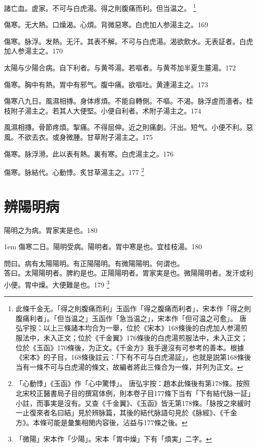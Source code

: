 諸亡血。虗家。不可与白虎湯。得之則腹痛而利。但当温之。
	\footnote{
		此條千金无。「得之則腹痛而利」玉函作「得之腹痛而利者」，宋本作「得之則腹痛利者」。「但当温之」玉函作「急当温之」，宋本作「但可温之可愈」。
		唐弘宇按：以上三條諸本均合为一舉，位於《宋本》168條後的白虎加人参湯煎服法中，未入正文；位於《千金翼》176條後的白虎湯煎服法中，未入正文；位於《玉函》170條後，为正文。《千金方》我手邊沒有可参考的善本。根據《宋本》的子目，168條後註云：「下有不可与白虎湯証」，也就是説第168條後当有一條不可与白虎湯的條文，故編者將此三條合为一條，并列为正文。
	}

傷寒。无大熱。口燥渴。心煩。背微惡寒。白虎{\khaaitp 加人参}湯主之。169

傷寒。脉浮。发熱。无汗。其表不解。不可与白虎湯。渴欲飲水。无表証者。白虎{\khaaitp 加人参}湯主之。170

太陽与少陽合病。自下利者。与黄芩湯。若嘔者。与黄芩加半夏生薑湯。172

傷寒。胸中有熱。胃中有邪气。腹中痛。欲嘔吐。黄連湯主之。173

傷寒八九日。風濕相摶。身体疼煩。不能自轉側。不嘔。不渴。脉浮虗而濇者。桂枝附子湯主之。若其人大便堅。小便自利者。术附子湯主之。174

風濕相摶。骨節疼煩。掣痛。不得屈伸。近之則痛劇。汗出。短气。小便不利。惡風。不欲去衣。或身微腫。甘草附子湯主之。175

傷寒。脉浮滑。此以表有熱。裏有寒。白虎湯主之。176

傷寒。脉結代。心動悸。炙甘草湯主之。177
	\footnote{
		「心動悸」《玉函》作「心中驚悸」。
		唐弘宇按：趙本此條後有第178條。按照北宋校正醫書局子目的撰寫体例，則本卷子目177條下当有「下有結代脉一証」小註，而事実是沒有。又查《千金翼》、《玉函》皆无第178條。「脉按之來緩时一止復來者名曰結」見於辨脉篇，其後的結代脉語句見於《脉經》、《千金方》。本條可能是彙集相関内容後，沾益与177條之後。
		}

\chapter{辨陽明病}

陽明之为病。胃家実是也。180

\hangindent 1em
傷寒二日。陽明受病。陽明者。胃中寒是也。宜桂枝湯。{\gaoben}180

問曰。病有太陽陽明。有正陽陽明。有微陽陽明。何谓也。\\
答曰。太陽陽明者。脾約是也。正陽陽明者。胃家実是也。微陽陽明者。发汗或利小便。胃中燥。大便難是也。179
	\footnote{「微陽」宋本作「少陽」。宋本「胃中燥」下有「煩実」二字。}

